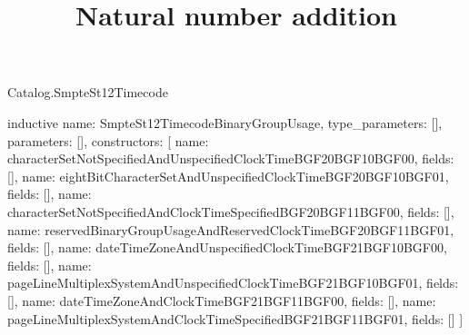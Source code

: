 \begin{lexlean}{Catalog.SmpteSt12Timecode}
\title{Natural number addition}
\begin{semanticmodule}
inductive{
  name: SmpteSt12TimecodeBinaryGroupUsage,
  type_parameters: [],
  parameters: [],
  constructors: [
    {name: characterSetNotSpecifiedAndUnspecifiedClockTimeBGF20BGF10BGF00, fields: []},
    {name: eightBitCharacterSetAndUnspecifiedClockTimeBGF20BGF10BGF01, fields: []},
    {name: characterSetNotSpecifiedAndClockTimeSpecifiedBGF20BGF11BGF00, fields: []},
    {name: reservedBinaryGroupUsageAndReservedClockTimeBGF20BGF11BGF01, fields: []},
    {name: dateTimeZoneAndUnspecifiedClockTimeBGF21BGF10BGF00, fields: []},
    {name: pageLineMultiplexSystemAndUnspecifiedClockTimeBGF21BGF10BGF01, fields: []},
    {name: dateTimeZoneAndClockTimeBGF21BGF11BGF00, fields: []},
    {name: pageLineMultiplexSystemAndClockTimeSpecifiedBGF21BGF11BGF01, fields: []}
  ]
}


\end{semanticmodule}
\end{lexlean}
